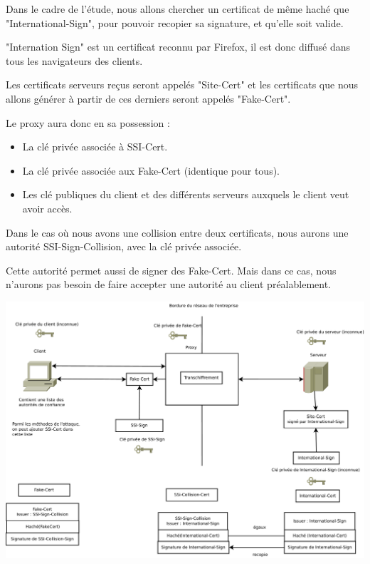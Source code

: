 \documentclass[a4paper,11pt,french]{article}
\begin{document}
Dans le cadre de l'étude, nous allons chercher un certificat de même haché que "International-Sign", pour pouvoir recopier sa signature, et qu'elle soit valide.

"Internation Sign" est un certificat reconnu par Firefox, il est donc diffusé dans tous les navigateurs des clients.

Les certificats serveurs reçus seront appelés "Site-Cert" et les certificats que nous allons générer à partir de ces derniers seront appelés "Fake-Cert".

Le proxy aura donc en sa possession :
\begin{itemize}
\item La clé privée associée à SSI-Cert.
\item La clé privée associée aux Fake-Cert (identique pour tous).
\item Les clé publiques du client et des différents serveurs auxquels le client veut avoir accès.
\end{itemize}

Dans le cas où nous avons une collision entre deux certificats, nous aurons une autorité SSI-Sign-Collision, avec la clé privée associée.

Cette autorité permet aussi de signer des Fake-Cert. Mais dans ce cas, nous n'aurons pas besoin de faire accepter une autorité au client préalablement.

\includegraphics[width=\textwidth]{images/schema_autorites.pdf}
\end{document}

